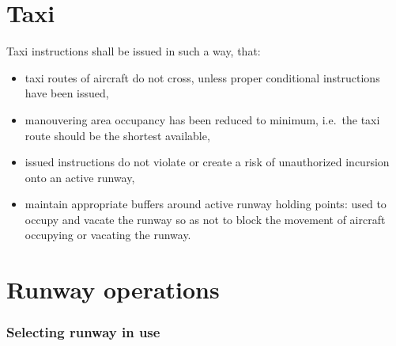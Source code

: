 \section{Taxi}

Taxi instructions shall be issued in such a way, that:
\begin{itemize}
    \item taxi routes of aircraft do not cross, unless proper conditional instructions have been issued,
    \item manouvering area occupancy has been reduced to minimum, i.e.\ the taxi route should be the shortest available,
    \item issued instructions do not violate or create a risk of unauthorized incursion onto an active runway, 
    \item maintain appropriate buffers around active runway holding points: used to occupy and vacate the runway so as not to block the movement of aircraft occupying or vacating the runway.
\end{itemize}

\section{Runway operations}
\subsubsection{Selecting runway in use}


